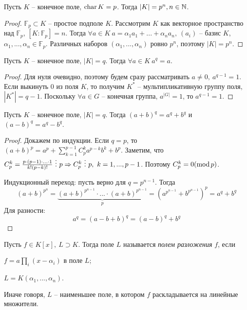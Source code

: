 \begin{Thm}
	Пусть $K$ -- конечное поле, $\operatorname{char} K = p$. Тогда $|K| = p^n, n \in \mathbb{N}$.
\end{Thm}

\begin{proof}
	$\mathbb{F}_p \subset K$ -- простое подполе $K$. Рассмотрим $K$ как векторное пространство над $\mathbb{F}_p$, $[K : \mathbb{F}_p] = n$.
	Тогда $\forall a \in K \ a = \alpha_1 a_1 + ... + \alpha_n a_n, \ (a_i)$ -- базис $K$, $\alpha_1, ..., \alpha_n \in \mathbb{F}_p$. Различных наборов $(\alpha_1, ..., \alpha_n)$ ровно $p^n$, поэтому $|K| = p^n$.  
\end{proof}

\begin{Lm}
	Пусть $K$ -- конечное поле, $|K| = q$. Тогда $\forall a \in K \ a^q = a$.
\end{Lm}

\begin{proof}
	Для нуля очевидно, поэтому будем сразу рассматривать $a \neq 0, \ a^{q - 1} = 1$.
	Если выкинуть 0 из поля $K$, то получим $K^*$ -- мультипликативную группу поля, $|K^*| = q - 1$.
	Поскольку $\forall a \in G$ -- конечная группа, $a^{|G|} = 1$, то $a^{q - 1} = 1$.  
\end{proof}

\begin{Lm}
	Пусть $K$ -- конечное поле, $|K| = q$. Тогда $(a + b)^q = a^q + b^q$ и $(a - b)^q = a^q - b^q$.  
\end{Lm}

\begin{proof}
	Докажем по индукции. Если $q = p$, то $(a + b)^p = a^p + \sum_{k = 1}^{p - 1} C_p^k a^{p - k}b^k + b^p$.
	Заметим, что $C_p^k = \frac{p \cdot (p - 1) \cdot ... \cdot 1}{k!(p - k)!} \ \vdots \ p \Rightarrow C_p^k \ \vdots \ p, \ k = 1, ..., p - 1$.
	Поэтому $C_p^k = 0 (\mathrm{mod}\, p)$.
	
	Индукционный переход: пусть верно для $q = p^{n - 1}$. Тогда
	\[(a + b)^{p^n} = \underbrace{(a+b)^{p^{n - 1}} \cdot ... \cdot (a+b)^{p^{n - 1}}}_p = \left(a^{p^{n - 1}} + b^{p^{n - 1}}\right)^p = a^q + b^q\]
	Для разности: 
	\[a^q = (a - b + b)^q = (a - b)^q + b^q\] 
\end{proof}

\begin{Def}
	Пусть $f \in K[x], \ L \supset K$. Тогда поле $L$ называется \textit{полем разложения} $f$, если  
	\begin{MyList}
		\item $f = a \prod_i (x - \alpha_i)$ в поле $L$;
		\item $L = K (\alpha_1, ..., \alpha_n)$.  
	\end{MyList}

	Иначе говоря, $L$ -- наименьшее поле, в котором $f$ раскладывается на линейные множители.
\end{Def}

